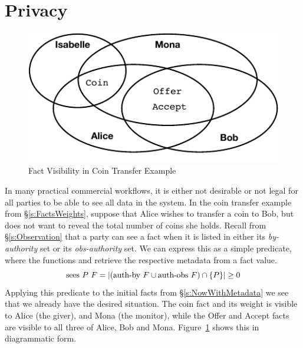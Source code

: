 
\clearpage{}
\section{Privacy}
\label{s:Privacy}

\begin{figure}
\begin{center}
\includegraphics{figure/coin-transfer-visibility.pdf}
\end{center}
\vspace{-2ex}
\caption{Fact Visibility in Coin Transfer Example}
\label{f:CoinTransferVisibility}
\end{figure}

In many practical commercial workflows, it is either not desirable or not legal for all parties to be able to see all data in the system. In the coin transfer example from \S\ref{s:FactsWeights}, suppose that Alice wishes to transfer a coin to Bob, but does not want to reveal the total number of coins she holds. Recall from \S\ref{s:Observation} that a party can see a fact when it is listed in either its \emph{by-authority} set or its \emph{obs-authority} set. We can express this as a simple predicate, where the functions  and  retrieve the respective metadata from a fact value.
$$
\textrm{sees}~ P~ F = |(\textrm{auth-by}~F \cup \textrm{auth-obs}~F) \cap \{P\}| \ge 0
$$
Applying this predicate to the initial facts from \S\ref{s:NowWithMetadata} we see that we already have the desired situation. The coin fact and its weight is visible to Alice (the giver), and Mona (the monitor), while the Offer and Accept facts are visible to all three of Alice, Bob and Mona. Figure~\ref{f:CoinTransferVisibility} shows this in diagrammatic form.


